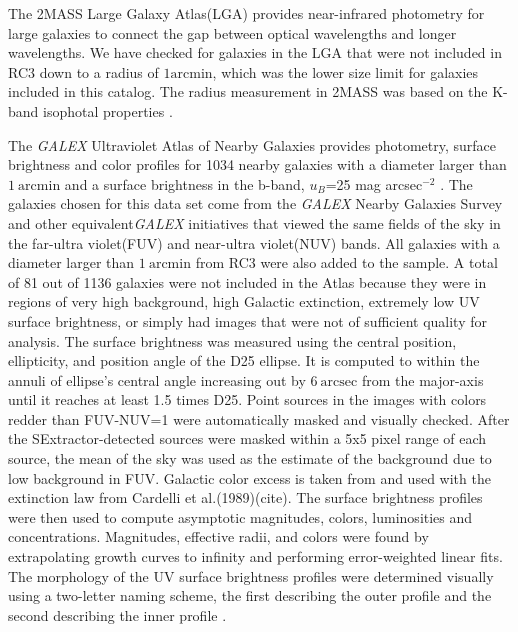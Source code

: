 \documentclass[12pt,preprint,pdftex]{aastex}
\newcommand{\units}[1]{\mathrm{#1}}
\renewcommand{\arcmin}{\units{arcmin}}
\renewcommand{\arcsec}{\units{arcsec}}
\begin{document}
The 2MASS Large Galaxy Atlas(LGA) provides near-infrared photometry for large galaxies to connect the gap between optical wavelengths and longer wavelengths. We have checked for galaxies in the LGA that were not included in RC3 down to a radius of $1\arcmin$, which was the lower size limit for galaxies included in this catalog. The radius measurement in 2MASS was based on the K-band isophotal properties \citep{jarrett03}.  

The \textit{GALEX} Ultraviolet Atlas of Nearby Galaxies provides photometry, surface brightness and color profiles for 1034 nearby galaxies with a diameter larger than $1~\arcmin$ and a surface brightness in the b-band, $u_B$=25 mag arcsec$^{-2}$ . The galaxies chosen for this data set come from the \textit{GALEX} Nearby Galaxies Survey and other equivalent\textit{GALEX} initiatives that viewed the same fields of the sky in the far-ultra violet(FUV) and near-ultra violet(NUV) bands. All galaxies with a diameter larger than $1~\arcmin$ from RC3 were also added to the sample. A total of 81 out of 1136 galaxies were not included in the Atlas because they were in regions of very high background, high Galactic extinction, extremely low UV surface brightness, or simply had images that were not of sufficient quality for analysis. The surface brightness was measured using the central position, ellipticity, and position angle of the D25 ellipse. It is computed to within the annuli of ellipse's central angle increasing out by $6~\arcsec$ from the major-axis until it reaches at least 1.5 times D25. Point sources in the images with colors redder than FUV-NUV=1 were automatically masked and visually checked. After the SExtractor-detected sources were masked within a 5x5 pixel range of each source, the mean of the sky was used as the estimate of the background due to low background in FUV. Galactic color excess is taken from \citep{schlegel98} and used with the extinction law from Cardelli et al.(1989)(cite). The surface brightness profiles were then used to compute asymptotic magnitudes, colors, luminosities and concentrations. Magnitudes, effective radii, and colors were found by extrapolating growth curves to infinity and performing error-weighted linear fits. The morphology of the UV surface brightness profiles were determined visually using a two-letter naming scheme, the first describing the outer profile and the second describing the inner profile \citep{gdp06}.
\end{document}
